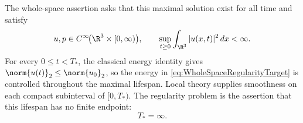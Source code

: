 The whole-space assertion asks that this maximal solution exist for all time and satisfy
\begin{equation}\label{eq:WholeSpaceRegularityTarget}
  u,p\in C^\infty\!\bigl(\R^3\times[0,\infty)\bigr),
  \qquad
  \sup_{t\geq0}\int_{\R^3}|u(x,t)|^2\,dx<\infty.
\end{equation}
For every \(0\leq t<T_*\), the classical energy identity gives \(\norm{u(t)}_2\leq\norm{u_0}_2\), so the energy in \eqref{eq:WholeSpaceRegularityTarget} is controlled throughout the maximal lifespan.
Local theory supplies smoothness on each compact subinterval of \([0,T_*)\).
The regularity problem is the assertion that this lifespan has no finite endpoint:
\[
  T_*=\infty.
\]
